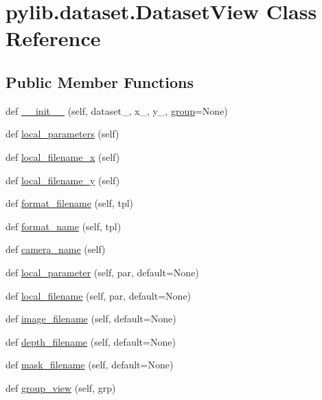 \hypertarget{classpylib_1_1dataset_1_1DatasetView}{}\section{pylib.\+dataset.\+Dataset\+View Class Reference}
\label{classpylib_1_1dataset_1_1DatasetView}
\subsection*{Public Member Functions}
\begin{DoxyCompactItemize}
\item 
def \hyperlink{classpylib_1_1dataset_1_1DatasetView_a718b04e16a827ce16668f78bd113d9c4}{\+\_\+\+\_\+init\+\_\+\+\_\+} (self, dataset\+\_\+, x\+\_\+, y\+\_\+, \hyperlink{classpylib_1_1dataset_1_1DatasetView_af4af4bd5b3829761b402e3b0733f8260}{group}=None)
\item 
def \hyperlink{classpylib_1_1dataset_1_1DatasetView_a4c9c95a428e8d06446c55447460db7e3}{local\+\_\+parameters} (self)
\item 
def \hyperlink{classpylib_1_1dataset_1_1DatasetView_ac39cb989581edcf4f12ed2859579f8de}{local\+\_\+filename\+\_\+x} (self)
\item 
def \hyperlink{classpylib_1_1dataset_1_1DatasetView_a7780ed9e38f4c12ce5d10691a34fe79b}{local\+\_\+filename\+\_\+y} (self)
\item 
def \hyperlink{classpylib_1_1dataset_1_1DatasetView_a2c739deabb26885b9797fd98dd7b40e5}{format\+\_\+filename} (self, tpl)
\item 
def \hyperlink{classpylib_1_1dataset_1_1DatasetView_a42dd68ac834f3600bd92abbf804c6d86}{format\+\_\+name} (self, tpl)
\item 
def \hyperlink{classpylib_1_1dataset_1_1DatasetView_aa7df9c35a86b125c23a8540dc3fb3e6a}{camera\+\_\+name} (self)
\item 
def \hyperlink{classpylib_1_1dataset_1_1DatasetView_ad37d515ef5d27f3f0d199dfd2a689e11}{local\+\_\+parameter} (self, par, default=None)
\item 
def \hyperlink{classpylib_1_1dataset_1_1DatasetView_aa6cb1dc104a2951f1db8c788150e27cf}{local\+\_\+filename} (self, par, default=None)
\item 
def \hyperlink{classpylib_1_1dataset_1_1DatasetView_afe88464a2736455a16613725666b5dca}{image\+\_\+filename} (self, default=None)
\item 
def \hyperlink{classpylib_1_1dataset_1_1DatasetView_aa5fa9fe806d8a4c644b90185e642a78f}{depth\+\_\+filename} (self, default=None)
\item 
def \hyperlink{classpylib_1_1dataset_1_1DatasetView_a88c65947586aa6349a0d6e377527ef8e}{mask\+\_\+filename} (self, default=None)
\item 
def \hyperlink{classpylib_1_1dataset_1_1DatasetView_a5c53a181f686f3c14d365af27ebe726a}{group\+\_\+view} (self, grp)
\end{DoxyCompactItemize}
